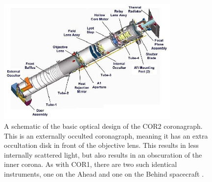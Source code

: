 \begin{figure}[!t]
\begin{center}
\includegraphics[width=0.8\textwidth]{images/cor2}
\caption[The COR2 coronagraph]{A schematic of the basic optical design of the COR2 coronagraph. This is an externally occulted coronagraph, meaning it has an extra occultation disk in front of the objective lens. This results in less internally scattered light, but also results in an obscuration of the inner corona. As with COR1, there are two such identical instruments, one on the Ahead and one on the Behind spacecraft \citep{how08}.}
\label{fig:cor2}
\end{center}
\end{figure}


